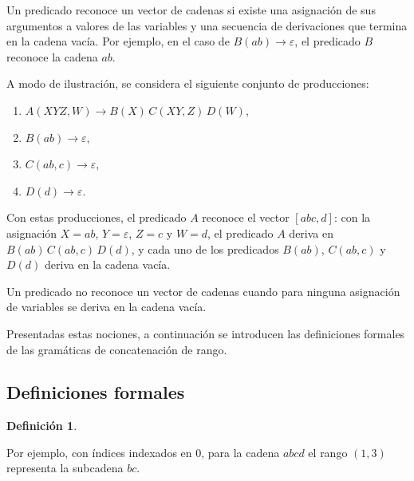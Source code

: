 \documentclass{report}
\theoremstyle{definition}
\newtheorem{definicion}{Definición}[chapter]
\theoremstyle{plain}
\theoremstyle{remark}
\begin{document}
Un predicado reconoce un vector de cadenas si existe una asignación de
sus argumentos a valores de las variables y una secuencia de
derivaciones que termina en la cadena vacía. Por ejemplo, en el caso de
$B(ab) \to \varepsilon$, el predicado $B$ reconoce la cadena $ab$.

A modo de ilustración, se considera el siguiente conjunto de
producciones:
\begin{enumerate}
  \item $A(XYZ, W) \to B(X)\, C(XY, Z)\, D(W)$,
  \item $B(ab) \to \varepsilon$,
  \item $C(ab, c) \to \varepsilon$,
  \item $D(d) \to \varepsilon$.
\end{enumerate}
Con estas producciones, el predicado $A$ reconoce el vector $[abc, d]$:
con la asignación $X = ab$, $Y = \varepsilon$, $Z = c$ y $W = d$, el
predicado $A$ deriva en $B(ab)\, C(ab, c)\, D(d)$, y cada uno de los
predicados $B(ab)$, $C(ab, c)$ y $D(d)$ deriva en la cadena vacía.

Un predicado no reconoce un vector de cadenas cuando para ninguna
asignación de variables se deriva en la cadena vacía.

Presentadas estas nociones, a continuación se introducen las
definiciones formales de las gramáticas de concatenación de rango.

\subsection{Definiciones formales}


\begin{definicion}
\end{definicion}

Por ejemplo, con índices indexados en $0$, para la cadena $abcd$ el
rango $(1, 3)$ representa la subcadena $bc$.
\end{document}

